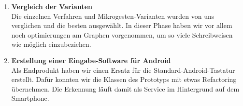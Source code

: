 \begin{enumerate}
\item  \textbf{Vergleich der Varianten} \\
Die einzelnen Verfahren und Mikrogesten-Varianten wurden von uns verglichen und die besten ausgewählt. In dieser Phase haben wir vor allem noch optimierungen am Graphen vorgenommen, um so viele Schreibweisen wie möglich einzubeziehen.

\item \textbf{Erstellung einer Eingabe-Software für Android} \\
Als Endprodukt haben wir einen Ersatz für die Standard-Android-Tastatur erstellt. Dafür konnten wir die Klassen des Prototyps mit etwas Refactoring übernehmen. Die Erkennung läuft damit als Service im Hintergrund auf dem Smartphone. 

\end{enumerate}